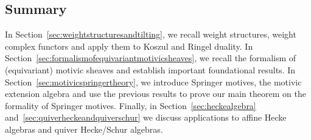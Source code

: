 \documentclass{amsart}
\theoremstyle{plain}
\theoremstyle{TheoremNum}
\theoremstyle{definition}
\theoremstyle{remark}
\numberwithin{equation}{section}
\newcommand{\Q}{\mathbb{Q}}
\newcommand{\M}{\widetilde{\mathcal{N}}}
\newcommand{\N}{\mathcal{N}}
\newcommand{\Chow}{\operatorname{CH}}
\begin{document}
\subsection*{Summary} In Section~\ref{sec:weightstructuresandtilting}, we recall weight structures, weight complex functors and apply them to Koszul and Ringel duality. In Section~\ref{sec:formalismofequivariantmotivicsheaves}, we recall the formalism of (equivariant) motivic sheaves and establish important foundational results. In Section~\ref{sec:motivicspringertheory}, we introduce Springer motives, the motivic extension algebra and use the previous results to prove our main theorem on the formality of Springer motives. Finally, in Section~\ref{sec:heckealgebra} and~\ref{sec:quiverheckeandquiverschur} we discuss applications to affine Hecke algebras and quiver Hecke/Schur algebras.
 
\end{document}
